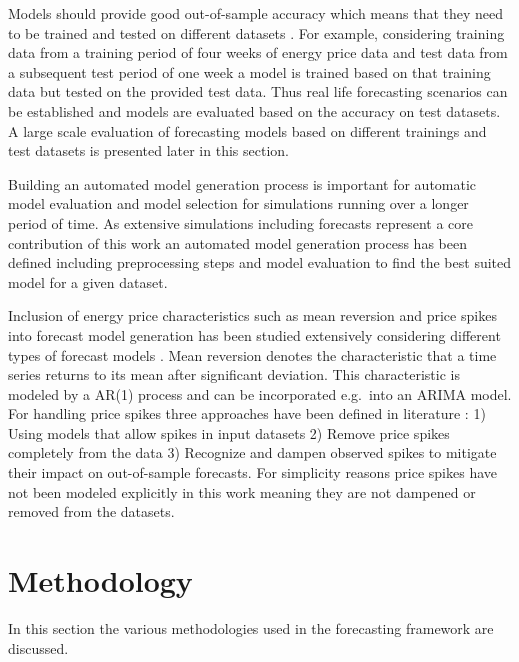 Models should provide good out-of-sample accuracy which means that they need to be trained and tested on different datasets \cite{hyndman2012forecasting}. For example, considering training data from a training period of four weeks of energy price data and test data from a subsequent test period of one week a model is trained based on that training data but tested on the provided test data. Thus real life forecasting scenarios can be established and models are evaluated based on the accuracy on test datasets. A large scale evaluation of forecasting models based on different trainings and test datasets is presented later in this section. 

Building an automated model generation process is important for automatic model evaluation and model selection for simulations running over a longer period of time. As extensive simulations including forecasts represent a core contribution of this work an automated model generation process has been defined including preprocessing steps and model evaluation to find the best suited model for a given dataset. 

Inclusion of energy price characteristics such as mean reversion and price spikes into forecast model generation has been studied extensively considering different types of forecast models \cite{weron2008forecasting,bunn2003forecasting,aggarwal2009electricity}. Mean reversion denotes the characteristic that a time series returns to its mean after significant deviation. This characteristic is modeled by a AR(1) process and can be incorporated e.g.~into an ARIMA model. For handling price spikes three approaches have been defined in literature \cite{weron2008forecasting}: 1) Using models that allow spikes in input datasets 2) Remove price spikes completely from the data 3) Recognize and dampen observed spikes to mitigate their impact on out-of-sample forecasts. For simplicity reasons price spikes have not been modeled explicitly in this work meaning they are not dampened or removed from the datasets. 



\section{Methodology}

In this section the various methodologies used in the forecasting framework are discussed. 



